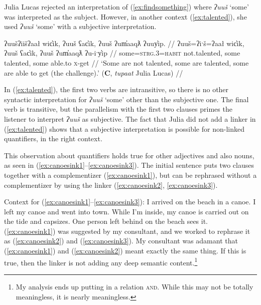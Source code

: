 Julia Lucas rejected an interpretation of (\ref{ex:findsomething}) where \textit{ʔuuš} `some' was interpreted as the subject. However, in another context (\ref{ex:talented}), she used \textit{ʔuuš} `some' with a subjective interpretation.

\ex \label{ex:talented}
\begingl
\glpreamble ʔuušʔiišʔaał wic̓ik, ʔuuš ʕac̓ik, ʔuuš ʔum̓aaqƛ ʔuuy̓ip. //
\gla ʔuuš=ʔiˑš=ʔaał wic̓ik, ʔuuš ʕac̓ik, ʔuuš ʔum̓aaqƛ ʔu-iˑy̓ip //
\glb some=\textsc{strg.3}=\textsc{habit} not.talented, some talented, some able.to \textsc{x}-get //
\glft ‘Some are not talented, some are talented, some are able to get (the challenge).’ (\textbf{C}, \textit{tupaat} Julia Lucas) //
\endgl
\xe

In (\ref{ex:talented}), the first two verbs are intransitive, so there is no other syntactic interpretation for \textit{ʔuuš} `some' other than the subjective one. The final verb is transitive, but the parallelism with the first two clauses primes the listener to interpret \textit{ʔuuš} as subjective. The fact that Julia did not add a linker in (\ref{ex:talented}) shows that a subjective interpretation is possible for non-linked quantifiers, in the right context. %

This observation about quantifiers holds true for other adjectives and also nouns, as seen in (\ref{ex:canoesink1}--\ref{ex:canoesink3}). The initial sentence puts two clauses together with a complementizer (\ref{ex:canoesink1}), but can be rephrased without a complementizer by using the linker (\ref{ex:canoesink2}, \ref{ex:canoesink3}).

\vspace{5pt}

\noindent Context for (\ref{ex:canoesink1}--\ref{ex:canoesink3}): I arrived on the beach in a canoe. I left my canoe and went into town. While I'm inside, my canoe is carried out on the tide and capsizes. One person left behind on the beach sees it. (\ref{ex:canoesink1}) was suggested by my consultant, and we worked to rephrase it as (\ref{ex:canoesink2}) and (\ref{ex:canoesink3}). My consultant was adamant that (\ref{ex:canoesink1}) and (\ref{ex:canoesink2}) meant exactly the same thing. If this is true, then the linker is not adding any deep semantic content.\footnote{My analysis ends up putting in a relation \textsc{and}. While this may not be totally meaningless, it is nearly	 meaningless.}

